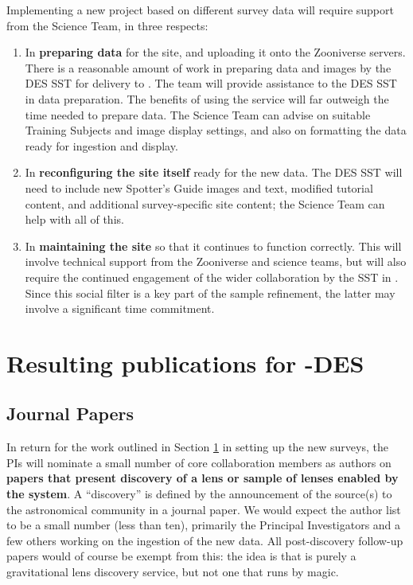 \documentclass[a4paper,twocolumn]{article}
\begin{document}
Implementing a new project based on different survey data will require support from the \sw Science Team, in three respects: 

\begin{enumerate}

\item In {\bf preparing data} for the site, and uploading it onto the
Zooniverse servers. There is a reasonable amount of work in preparing data and images by the DES SST for delivery to \sw. The \sw team will provide assistance to the DES SST in data preparation. The benefits of using the \sw service will far outweigh the time needed to prepare data.  The \sw Science Team can advise on suitable Training
Subjects and image display settings, and also on formatting the data
ready for ingestion and display.

\item In {\bf reconfiguring the site itself} ready for the new data. The DES
SST will need to include new Spotter's Guide images and text,
modified tutorial content, and additional survey-specific site content;
the \sw Science Team can help with all of this.

\item In {\bf maintaining the site} so that it continues to function
correctly. This will involve technical support from the Zooniverse and \sw science teams,
but will also require the continued engagement of the wider
collaboration by the SST in \Talk. Since this social filter is
a key part of the sample refinement, the latter may involve a
significant time commitment.

\end{enumerate}




\section{Resulting publications for \sw-DES }
\label{sec:series}

\subsection{Journal Papers}
\label{sec:papers}
In return for the work outlined in Section \ref{sec:series} in setting up the new surveys, the \sw PIs will nominate a
small number of core \sw collaboration members as authors on \textbf{papers that
present discovery of a lens or sample of lenses enabled by the \sw system}. A ``discovery'' is defined by the announcement of the source(s) to the astronomical community in a journal paper. We would expect the \sw author list to be a small number (less than ten), primarily the Principal Investigators and a few others working on the ingestion of the new data. All post-discovery follow-up papers would of course be exempt from this: the idea is that \sw is purely a gravitational lens discovery service, but not one that runs by magic.
\end{document}
